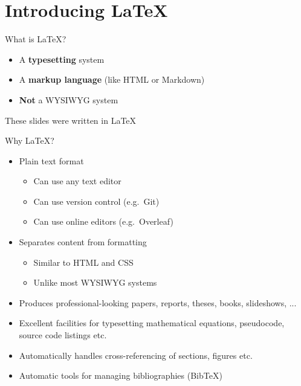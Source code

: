 
\part{Introducing LaTeX}
\frame{\partpage}

\begin{frame}{What is LaTeX?}
    \begin{itemize}
        \pause\item A \textbf{typesetting} system
        \pause\item A \textbf{markup language}
                (like HTML or Markdown)
		\pause\item \textbf{Not} a WYSIWYG system
    \end{itemize}
\end{frame}

\begin{frame}{These slides were written in LaTeX}
    
\end{frame}

\begin{frame}{Why LaTeX?}
\begin{itemize}
	\pause\item Plain text format
	\begin{itemize}
		\pause\item Can use any text editor
		\pause\item Can use version control (e.g.\ Git)
		\pause\item Can use online editors (e.g.\ Overleaf)
	\end{itemize}
	\pause\item Separates content from formatting
	\begin{itemize}
		\pause\item Similar to HTML and CSS
		\pause\item Unlike most WYSIWYG systems
	\end{itemize}
	\pause\item Produces professional-looking papers, reports, theses, books, slideshows, ...
	\pause\item Excellent facilities for typesetting mathematical equations, pseudocode, source code listings etc.
	\pause\item Automatically handles cross-referencing of sections, figures etc.
	\pause\item Automatic tools for managing bibliographies (BibTeX)
\end{itemize}
\end{frame}

